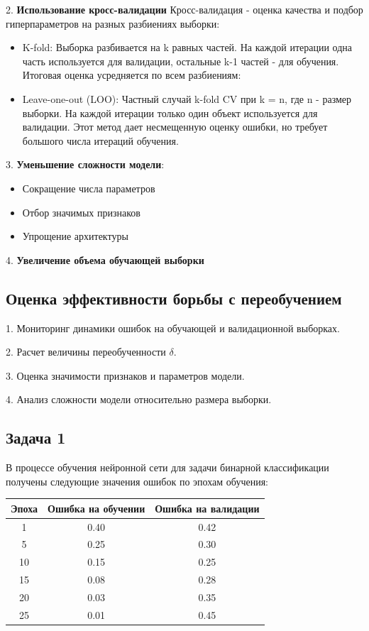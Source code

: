2. \textbf{Использование кросс-валидации}
Кросс-валидация - оценка качества и подбор гиперпараметров на разных разбиениях выборки:
  \begin{itemize}
     \item K-fold: Выборка разбивается на k равных частей. На каждой итерации одна часть используется для валидации, остальные k-1 частей - для обучения. Итоговая оценка усредняется по всем разбиениям:
     \item Leave-one-out (LOO): Частный случай k-fold CV при k = n, где n - размер выборки. На каждой итерации только один объект используется для валидации. Этот метод дает несмещенную оценку ошибки, но требует большого числа итераций обучения.
  \end{itemize}

3. \textbf{Уменьшение сложности модели}:
  \begin{itemize}
     \item Сокращение числа параметров
     \item Отбор значимых признаков
     \item Упрощение архитектуры
  \end{itemize}

4. \textbf{Увеличение объема обучающей выборки}

\subsection*{Оценка эффективности борьбы с переобучением}

1. Мониторинг динамики ошибок на обучающей и валидационной выборках.

2. Расчет величины переобученности $\delta$.

3. Оценка значимости признаков и параметров модели.

4. Анализ сложности модели относительно размера выборки.

\subsection*{Задача 1}
В процессе обучения нейронной сети для задачи бинарной классификации получены следующие значения ошибок по эпохам обучения:

\begin{center}
\begin{tabular}{|c|c|c|}
\hline
Эпоха & Ошибка на обучении & Ошибка на валидации \\
\hline
1 & 0.40 & 0.42 \\
5 & 0.25 & 0.30 \\
10 & 0.15 & 0.25 \\
15 & 0.08 & 0.28 \\
20 & 0.03 & 0.35 \\
25 & 0.01 & 0.45 \\
\hline
\end{tabular}
\end{center}

